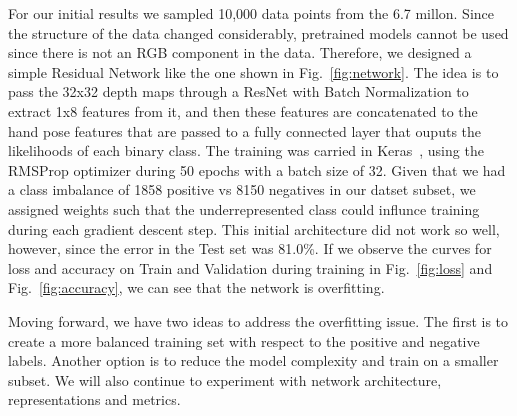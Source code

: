 \documentclass[letterpaper, 10 pt]{article}
\newcommand{\figref}[1]{Fig.~\ref{#1}} %
\begin{document}
For our initial results we sampled 10,000 data points from the 6.7 millon. 
Since the structure of the data changed considerably, pretrained models cannot be used since there is not an RGB component in the data. 
Therefore, we designed a simple Residual Network like the one shown in \figref{fig:network}. 
The idea is to pass the 32x32 depth maps through a ResNet with Batch Normalization to extract 1x8 features from it, and then these features are concatenated to the hand pose features that are passed to a fully connected layer that ouputs the likelihoods of each binary class. 
The training was carried in Keras~\cite{chollet2017keras}, using the RMSProp optimizer during 50 epochs with a batch size of 32. 
Given that we had a class imbalance of 1858 positive vs 8150 negatives in our datset subset, we assigned weights such that the underrepresented class could influnce training during each gradient descent step. 
This initial architecture did not work so well, however, since the error in the Test set was 81.0\%. 
If we observe the curves for loss and accuracy on Train and Validation during training in \figref{fig:loss} and \figref{fig:accuracy}, we can see that the network is overfitting. 

Moving forward, we have two ideas to address the overfitting issue.
The first is to create a more balanced training set with respect to the positive and negative labels. 
Another option is to reduce the model complexity and train on a smaller subset. 
We will also continue to experiment with network architecture, representations and metrics. 
\end{document}
